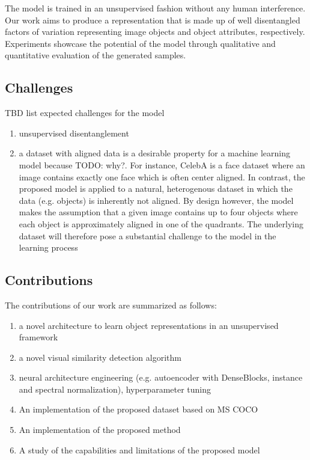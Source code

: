 \documentclass[12pt,a4paper]{article}
\begin{document}
The model is trained in an unsupervised fashion without any human interference. Our work aims to produce a representation that is made up of well disentangled factors of variation representing image objects and object attributes, respectively. Experiments showcase the potential of the model through qualitative and quantitative evaluation of the generated samples.

\subsection{Challenges}
TBD list expected challenges for the model
\begin{enumerate}
  \item unsupervised disentanglement
  \item a dataset with aligned data is a desirable property for a machine learning model because TODO: why?. For instance, CelebA is a face dataset where an image contains exactly one face which is often center aligned. In contrast, the proposed model is applied to a natural, heterogenous dataset in which the data (e.g. objects) is inherently not aligned. By design however, the model makes the assumption that a given image contains up to four objects where each object is approximately aligned in one of the quadrants. The underlying dataset will therefore pose a substantial challenge to the model in the learning process
\end{enumerate}

\subsection{Contributions}
The contributions of our work are summarized as follows:
\begin{enumerate}
  \item a novel architecture to learn object representations in an unsupervised framework
  \item a novel visual similarity detection algorithm
  \item neural architecture engineering (e.g. autoencoder with DenseBlocks, instance and spectral normalization), hyperparameter tuning
  \item An implementation of the proposed dataset based on MS COCO
  \item An implementation of the proposed method
  \item A study of the capabilities and limitations of the proposed model
\end{enumerate}
\end{document}
